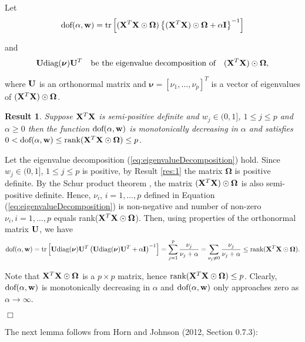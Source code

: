 \documentclass[11pt]{article}
\newtheorem{Result}{Result}
\newtheorem{Main Result}{Main Result}
\def\vectorfontone{\bf}
\def\vectorfonttwo{\boldsymbol}
\def\vw{{\vectorfontone w}}                      %
\def\vnu{{\vectorfonttwo \nu}}                   %
\def\matrixfontone{\bf}
\def\matrixfonttwo{\boldsymbol}
\def\mI{{\matrixfontone I}}                      %
\def\mU{{\matrixfontone U}}                      %
\def\mX{{\matrixfontone X}}                      %
\def\mOmega{{\matrixfonttwo \Omega}}             %
\def\tr{\text{tr}}
\begin{document}
\noindent
Let
$$
\mbox{dof}(\alpha,\vw) = \tr\left[(\mX^T\mX\odot\mOmega)\left\{(\mX^T\mX)\odot\mOmega + \alpha\mI\right\}^{-1} \right]
$$

\noindent and
\begin{equation}\label{eq:eigenvalueDecomposition}
\mU\mbox{diag}(\vnu)\mU^T \quad \mbox{be the eigenvalue
	decomposition of} \quad (\mX^T\mX)\odot\mOmega,
\end{equation}

\noindent where $\mU$ is an orthonormal matrix
and $\vnu = [\nu_1,\ldots,\nu_{p}]^T$ is a vector of eigenvalues
of $(\mX^T\mX)\odot\mOmega$.
\begin{Result}\label{res:2}
	Suppose $\mX^T\mX$ is semi-positive definite and
	$w_j\in(0,1]$, $1\le j\le p$ and $\alpha\ge 0$ then the function
	$\mbox{dof}(\alpha,\vw)$ is monotonically decreasing in $\alpha$ and satisfies $0<\mbox{dof}(\alpha,\vw)\le \mbox{rank}(\mX^T\mX\odot\mOmega)\leq p$.
\end{Result}

 Let the eigenvalue decomposition
(\ref{eq:eigenvalueDecomposition}) hold. Since $w_j\in(0,1]$, $1\le j\le p$
is positive, by Result \ref{res:1} the matrix $\mOmega$ is positive definite. By the
Schur product theorem \citep[Theorem 7.5.2]{Horn2012}, the matrix
$(\mX^T\mX)\odot\mOmega$ is also semi-positive definite. Hence,
$\nu_i$, $i=1,\ldots,p$ defined in Equation (\ref{eq:eigenvalueDecomposition}) is non-negative and number of non-zero $\nu_i, i=1,\ldots,p$ equals rank($\mX^T\mX\odot\mOmega$). Then, using properties of the
orthonormal matrix $\mU$, we have
$$
\mbox{dof}(\alpha,\vw) =
\tr\left[ \mU\mbox{diag}(\vnu)\mU^T
\left(\mU\mbox{diag}(\vnu)\mU^T + \alpha\mI\right)^{-1}\right] =
\sum_{j=1}^{p} \frac{\nu_j}{\nu_j + \alpha}=
\sum_{\nu_j\neq 0} \frac{\nu_j}{\nu_j + \alpha}\leq \mbox{rank}(\mX^T\mX\odot\mOmega).
$$

\noindent Note that $\mX^T\mX\odot\mOmega$ is a $p\times p$ matrix, hence $\mbox{rank}(\mX^T\mX\odot\mOmega)\leq p$. Clearly, $\mbox{dof}(\alpha,\vw)$ is monotonically decreasing in $\alpha$ and $\mbox{dof}(\alpha,\vw)$ only approaches zero
as $\alpha\to \infty$.
\vspace{-0.5cm}\begin{flushright}$\Box$\end{flushright}


\noindent The next lemma follows from Horn and Johnson (2012, Section 0.7.3):
\end{document}
